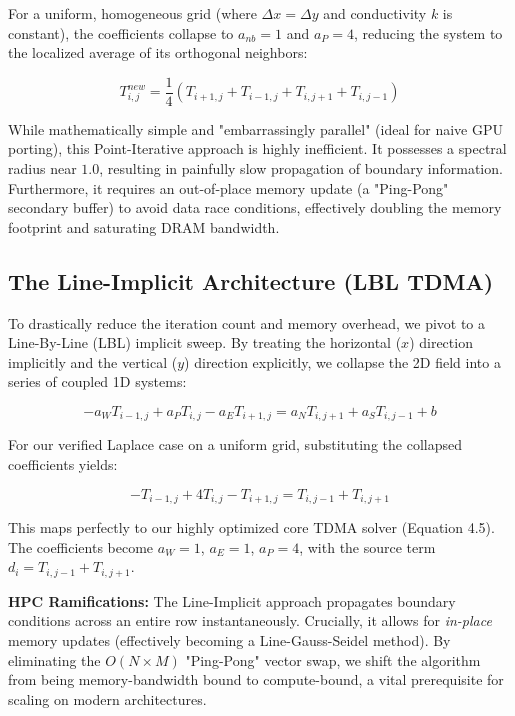 For a uniform, homogeneous grid (where $\Delta x = \Delta y$ and conductivity $k$ is constant), the coefficients collapse to $a_{nb} = 1$ and $a_P = 4$, reducing the system to the localized average of its orthogonal neighbors:

\begin{equation}
    T_{i,j}^{new} = \frac{1}{4} \left( T_{i+1,j} + T_{i-1,j} + T_{i,j+1} + T_{i,j-1} \right)
\end{equation}

While mathematically simple and "embarrassingly parallel" (ideal for naive GPU porting), 
this Point-Iterative approach is highly inefficient. It possesses a spectral radius near $1.0$, 
resulting in painfully slow propagation of boundary information. Furthermore, it requires an 
out-of-place memory update (a "Ping-Pong" secondary buffer) to avoid data race conditions, 
effectively doubling the memory footprint and saturating DRAM bandwidth.

\subsection{The Line-Implicit Architecture (LBL TDMA)}
To drastically reduce the iteration count and memory overhead, we pivot to a Line-By-Line (LBL) implicit sweep. By treating the horizontal ($x$) direction implicitly and the vertical ($y$) direction explicitly, we collapse the 2D field into a series of coupled 1D systems:

\begin{equation}
    -a_W T_{i-1,j} + a_P T_{i,j} - a_E T_{i+1,j} = a_N T_{i,j+1} + a_S T_{i,j-1} + b
\end{equation}

For our verified Laplace case on a uniform grid, substituting the collapsed coefficients yields:

\begin{equation}
    -T_{i-1,j} + 4T_{i,j} - T_{i+1,j} = T_{i,j-1} + T_{i,j+1}
\end{equation}

This maps perfectly to our highly optimized core TDMA solver (Equation 4.5). The coefficients become $a_W = 1$, $a_E = 1$, $a_P = 4$, with the source term $d_i = T_{i,j-1} + T_{i,j+1}$.

\textbf{HPC Ramifications:} The Line-Implicit approach propagates boundary conditions across an entire row instantaneously. Crucially, it allows for \textit{in-place} memory updates (effectively becoming a Line-Gauss-Seidel method). By eliminating the $O(N \times M)$ "Ping-Pong" vector swap, we shift the algorithm from being memory-bandwidth bound to compute-bound, a vital prerequisite for scaling on modern architectures.

